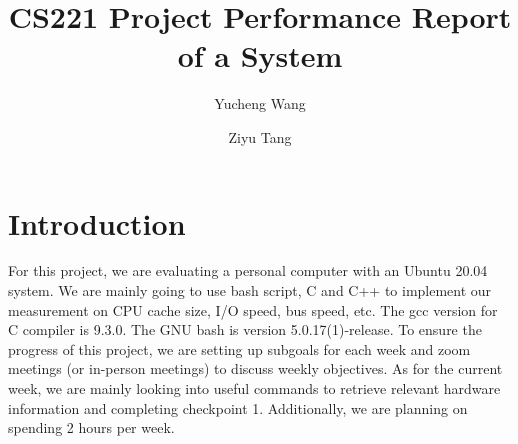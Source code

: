 \usepackage{tikz}
\usepackage{amsmath}

\usepackage{filecontents}



\date{}

\title{\Large \bf CS221 Project Performance Report of a System}

\author{
{\rm Yucheng Wang}
\and
{\rm Ziyu Tang}
} %

\maketitle

\begin{abstract}

\end{abstract}


\section{Introduction}
\hspace{2em}For this project, we are evaluating a personal computer with an Ubuntu 20.04 system. We are mainly going to use bash script, C and C++ to implement our measurement on CPU cache size, I/O speed, bus speed, etc. The gcc version for C compiler is 9.3.0. The GNU bash is version 5.0.17(1)-release. To ensure the progress of this project, we are setting up subgoals for each week and zoom meetings (or in-person meetings) to discuss weekly objectives. As for the current week, we are mainly looking into useful commands to retrieve relevant hardware information and completing checkpoint 1. Additionally, we are planning on spending 2 hours per week. 


